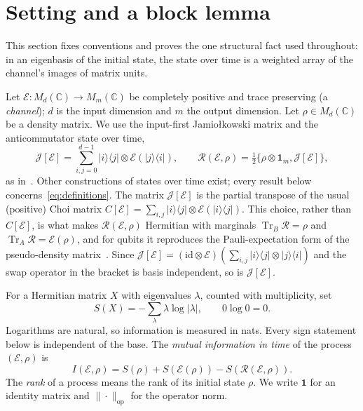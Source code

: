 \documentclass[11pt,a4paper]{article}
\theoremstyle{definition}\newtheorem{definition}[theorem]{Definition}
\theoremstyle{remark}\newtheorem{remark}[theorem]{Remark}
\newcommand{\Tr}{\operatorname{Tr}}
\newcommand{\ket}[1]{\lvert #1\rangle}
\newcommand{\bra}[1]{\langle #1\rvert}
\newcommand{\op}{\mathrm{op}}
\newcommand{\one}{\mathbf{1}}
\newcommand{\E}{\mathcal E}
\newcommand{\R}{\mathcal R}
\newcommand{\J}{\mathcal J}
\begin{document}
\section{Setting and a block lemma}\label{sec:setting}
This section fixes conventions and proves the one structural fact used throughout: in an eigenbasis of the initial state, the state over time is a weighted array of the channel's images of matrix units.

Let $\E:M_d(\mathbb C)\to M_m(\mathbb C)$ be completely positive and trace preserving (a \emph{channel}); $d$ is the input dimension and $m$ the output dimension. Let $\rho\in M_d(\mathbb C)$ be a density matrix. We use the input-first Jamio\l{}kowski matrix and the anticommutator state over time,
\begin{equation}\label{eq:definitions}
 \J[\E]=\sum_{i,j=0}^{d-1}\ket{i}\bra{j}\otimes\E(\ket{j}\bra{i}),
 \qquad
 \R(\E,\rho)=\tfrac12\{\rho\otimes\one_m,\J[\E]\},
\end{equation}
as in~\cite{FP,WPVF,FY}. Other constructions of states over time exist; every result below concerns~\eqref{eq:definitions}. The matrix $\J[\E]$ is the partial transpose of the usual (positive) Choi matrix $C[\E]=\sum_{i,j}\ket{i}\bra{j}\otimes\E(\ket{i}\bra{j})$. This choice, rather than $C[\E]$, is what makes $\R(\E,\rho)$ Hermitian with marginals $\Tr_B\R=\rho$ and $\Tr_A\R=\E(\rho)$, and for qubits it reproduces the Pauli-expectation form of the pseudo-density matrix~\cite{FY}. Since $\J[\E]=(\mathrm{id}\otimes\E)(\sum_{i,j}\ket{i}\bra{j}\otimes\ket{j}\bra{i})$ and the swap operator in the bracket is basis independent, so is $\J[\E]$.

For a Hermitian matrix $X$ with eigenvalues $\lambda$, counted with multiplicity, set
\begin{equation}\label{eq:entropy}
 S(X)=-\sum_{\lambda}\lambda\log|\lambda|,\qquad 0\log0=0.
\end{equation}
Logarithms are natural, so information is measured in nats. Every sign statement below is independent of the base. The \emph{mutual information in time} of the process $(\E,\rho)$ is
\begin{equation}\label{eq:mi}
 I(\E,\rho)=S(\rho)+S(\E(\rho))-S(\R(\E,\rho)).
\end{equation}
The \emph{rank} of a process means the rank of its initial state $\rho$. We write $\one$ for an identity matrix and $\|\cdot\|_\op$ for the operator norm.
\end{document}
